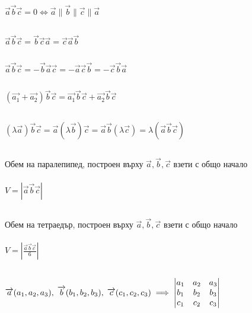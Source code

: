 \documentclass{article}
\newcommand{\vectr}{\overrightarrow}
\begin{document}
    \subsection{}
    \(\vectr{a}\vectr{b}\vectr{c} = 0 \iff \vectr{a} \parallel \vectr{b} \parallel \vectr{c} \parallel \vectr{a}\)
    \subsection{}
    \(\vectr{a}\vectr{b}\vectr{c} = \vectr{b}\vectr{c}\vectr{a} = \vectr{c}\vectr{a}\vectr{b}\)
    \subsection{}
    \(\vectr{a}\vectr{b}\vectr{c} = -\vectr{b}\vectr{a}\vectr{c} = -\vectr{a}\vectr{c}\vectr{b} = -\vectr{c}\vectr{b}\vectr{a}\)
    \subsection{}
    \((\vectr{a_1} + \vectr{a_2})\vectr{b}\vectr{c} = \vectr{a_1}\vectr{b}\vectr{c} + \vectr{a_2}\vectr{b}\vectr{c}\)
    \subsection{}
    \((\lambda\vectr{a})\vectr{b}\vectr{c} = \vectr{a}(\lambda\vectr{b})\vectr{c} = \vectr{a}\vectr{b}(\lambda\vectr{c}) = \lambda(\vectr{a}\vectr{b}\vectr{c})\)
    \subsection{}
    Обем на паралепипед, построен върху \(\vectr{a}, \vectr{b}, \vectr{c}\) взети с общо начало\\
    \\\(V = |\vectr{a}\vectr{b}\vectr{c}|\)
    \subsection{}
    Обем на тетраедър, построен върху \(\vectr{a}, \vectr{b}, \vectr{c}\) взети с общо начало\\
    \\\(V = |\frac{\vectr{a}\vectr{b}\vectr{c}}{6}|\)
    \subsection{}
    \(\vectr{a}(a_1, a_2, a_3), \; \vectr{b}(b_1, b_2, b_3), \; \vectr{c}(c_1, c_2, c_3)\\
    \\\implies \begin{vmatrix}
        a_1 & a_2 & a_3 \\
        b_1 & b_2 & b_3 \\
        c_1 & c_2 & c_3
    \end{vmatrix}\)
\end{document}
